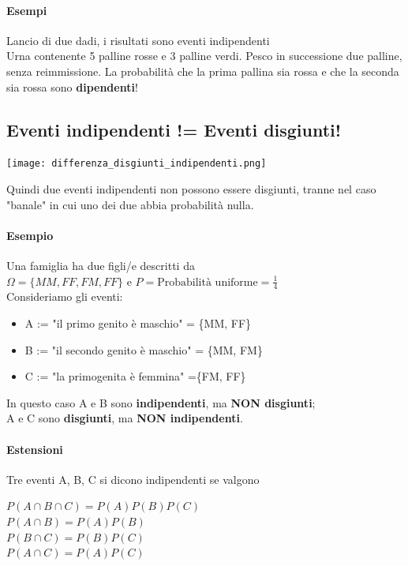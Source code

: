 \documentclass[12pt, a4paper, openany]{book}
\begin{document}
\paragraph{Esempi}
Lancio di due dadi, i risultati sono eventi indipendenti
\\ Urna contenente 5 palline rosse e 3 palline verdi. Pesco in successione due palline, 
senza reimmissione. La probabilità che la prima pallina sia rossa e che la seconda sia rossa
sono \textbf{dipendenti}!

\subsection{Eventi indipendenti != Eventi disgiunti!}
\begin{center}
    \texttt{[image: differenza\_disgiunti\_indipendenti.png]}
\end{center}
Quindi due eventi indipendenti non possono essere disgiunti,
tranne nel caso "banale" in cui uno dei due abbia probabilità
nulla.

\paragraph*{Esempio} Una famiglia ha due figli/e descritti da 
\\ $\Omega = \{MM, FF, FM, FF\}$ e $P=\text{Probabilità uniforme} = \frac{1}{4}$
\\ Consideriamo gli eventi:
\begin{itemize}
    \item A := "il primo genito è maschio" = \{MM, FF\}
    \item B := "il secondo genito è maschio" = \{MM, FM\}
    \item C := "la primogenita è femmina" =\{FM, FF\}
\end{itemize}
\begin{center}
    In questo caso A e B sono \textbf{indipendenti}, ma \textbf{NON disgiunti};
\\ A e C sono \textbf{disgiunti}, ma \textbf{NON indipendenti}.
\end{center}

\paragraph{Estensioni}
Tre eventi A, B, C si dicono indipendenti se valgono
\begin{center}
    $P(A \cap B \cap C) = P(A)P(B)P(C)$
    \\$P(A \cap B) = P(A)P(B)$
    \\$P(B \cap C) = P(B)P(C)$
    \\$P(A \cap C) = P(A)P(C)$
\end{center}
\end{document}
